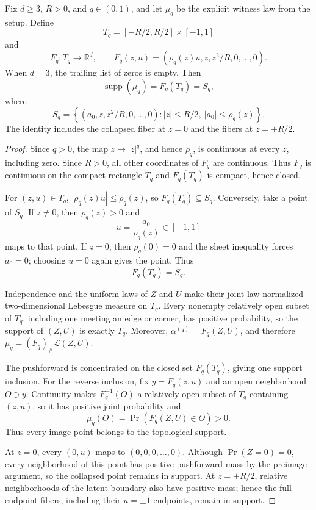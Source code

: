 \begin{proposition}
\label{prop:exact-sheet-support}
Fix $d\geq3$, $R>0$, and $q\in(0,1)$, and let $\mu_q$ be the explicit
witness law from the setup.  Define
\[
T_q=[-R/2,R/2]\times[-1,1]
\]
and
\[
F_q:T_q\longrightarrow\mathbb R^d,
\qquad
F_q(z,u)=(\rho_q(z)u,z,z^2/R,0,\ldots,0).
\]
When $d=3$, the trailing list of zeros is empty.  Then
\[
\operatorname{supp}(\mu_q)=F_q(T_q)=S_q,
\]
where
\[
S_q=\left\{(a_0,z,z^2/R,0,\ldots,0):
|z|\leq R/2,\ |a_0|\leq\rho_q(z)\right\}.
\]
The identity includes the collapsed fiber at $z=0$ and the fibers at
$z=\pm R/2$.
\end{proposition}

\begin{proof}
Since $q>0$, the map $z\mapsto|z|^q$, and hence $\rho_q$, is continuous
at every $z$, including zero.  Since $R>0$, all other coordinates of
$F_q$ are continuous.  Thus $F_q$ is continuous on the compact rectangle
$T_q$ and $F_q(T_q)$ is compact, hence closed.

For $(z,u)\in T_q$, $|\rho_q(z)u|\leq\rho_q(z)$, so
$F_q(T_q)\subseteq S_q$.  Conversely, take a point of $S_q$.  If
$z\neq0$, then $\rho_q(z)>0$ and
\[
u=\frac{a_0}{\rho_q(z)}\in[-1,1]
\]
maps to that point.  If $z=0$, then $\rho_q(0)=0$ and the sheet
inequality forces $a_0=0$; choosing $u=0$ again gives the point.  Thus
\[
F_q(T_q)=S_q.
\]

Independence and the uniform laws of $Z$ and $U$ make their joint law
normalized two-dimensional Lebesgue measure on $T_q$.  Every nonempty
relatively open subset of $T_q$, including one meeting an edge or corner,
has positive probability, so the support of $(Z,U)$ is exactly $T_q$.
Moreover, $\alpha^{(q)}=F_q(Z,U)$, and therefore
$\mu_q=(F_q)_\#\mathcal L(Z,U)$.

The pushforward is concentrated on the closed set $F_q(T_q)$, giving one
support inclusion.  For the reverse inclusion, fix $y=F_q(z,u)$ and an
open neighborhood $O\ni y$.  Continuity makes $F_q^{-1}(O)$ a relatively
open subset of $T_q$ containing $(z,u)$, so it has positive joint
probability and
\[
\mu_q(O)=\Pr(F_q(Z,U)\in O)>0.
\]
Thus every image point belongs to the topological support.

At $z=0$, every $(0,u)$ maps to $(0,0,0,\ldots,0)$.  Although
$\Pr(Z=0)=0$, every neighborhood of this point has positive pushforward
mass by the preimage argument, so the collapsed point remains in support.
At $z=\pm R/2$, relative neighborhoods of the latent boundary also have
positive mass; hence the full endpoint fibers, including their
$u=\pm1$ endpoints, remain in support.
\end{proof}

